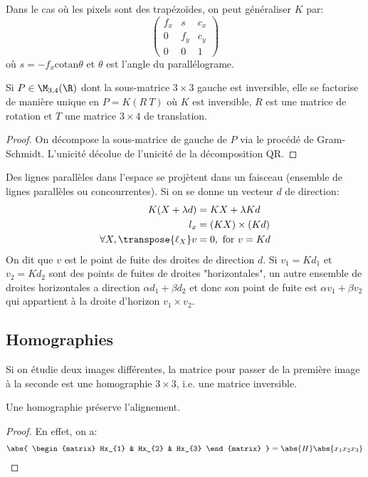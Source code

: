 \documentclass[info, math]{mpb-cours}
\begin{document}
Dans le cas où les pixels sont des trapézoïdes, on peut généraliser $K$ par:
\begin{equation*}
	\begin{pmatrix}
		f_{x} & s & c_{x} \\ 0 & f_{y} & c_{y}\\ 0 & 0 & 1
	\end{pmatrix}
\end{equation*}
où $s = -f_{x} \mathrm{cotan} \theta$ et $\theta$ est l'angle du parallélograme.

\begin{thm}
	Si $P \in \M_{3, 4}(\R)$ dont la sous-matrice $3\times 3$ gauche est inversible, elle se
	factorise de manière unique en $P = K (R \ T)$ où $K$ est inversible, $R$ est une matrice
	de rotation et $T$ une matrice $3 \times 4$ de translation.
\end{thm}
\begin{proof}
	On décompose la sous-matrice de gauche de $P$ via le procédé de Gram-Schmidt. L'unicité décolue de l'unicité de la décomposition QR.
\end{proof}

Des lignes parallèles dans l'espace se projètent dans un faisceau (ensemble de lignes parallèles ou concourrentes).
Si on se donne un vecteur $d$ de direction:
\begin{equation*}
	\begin{aligned}
		K(X + \lambda d)                 & = KX + \lambda Kd        \\
		l_{x}                            & = (KX) \times (Kd)       \\
		\forall X, \transpose{\ell_{X}}v & = 0, \text{ for } v = Kd
	\end{aligned}
\end{equation*}
On dit que $v$ est le point de fuite des droites de direction $d$.
Si $v_{1} = Kd_{1}$ et $v_{2} = Kd_{2}$ sont des points de fuites de droites "horizontales", un autre ensemble
de droites horizontales a direction $\alpha d_{1} + \beta d_{2}$ et donc son point de fuite est $\alpha v_{1} + \beta v_{2}$
qui appartient à la droite d'horizon $v_{1} \times v_{2}$.

\subsection{Homographies}
Si on étudie deux images différentes, la matrice pour passer de la première image à la seconde est une homographie $3 \times 3$, i.e. une matrice inversible.
\begin{proposition}
	Une homographie préserve l'alignement.
\end{proposition}
\begin{proof}
	En effet, on a:
	\begin{equation*}
		\abs{
			\begin{matrix}
				Hx_{1} & Hx_{2} & Hx_{3}
			\end{matrix}
		} = \abs{H} \abs{\begin{matrix} x_{1}x_{2}x_{3}\end{matrix}}
	\end{equation*}
\end{proof}
\end{document}
